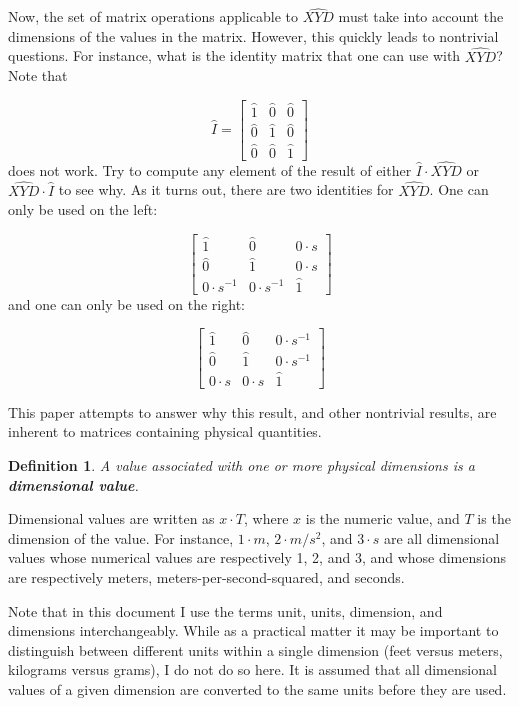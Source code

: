 \documentclass[10pt,letterpaper]{article}
\newtheorem{defn}{Definition}[section]
\numberwithin{equation}{section}
\begin{document}
Now, the set of matrix operations applicable to $\widehat{XYD}$ must take into
account the dimensions of the values in the matrix.  However, this quickly
leads to nontrivial questions.  For instance, what is the identity matrix that
one can use with $\widehat{XYD}$?  Note that

\[ \hat I = \left[ \begin{matrix} 
  \hat 1 & \hat 0 & \hat 0 \\
  \hat 0 & \hat 1 & \hat 0 \\
  \hat 0 & \hat 0 & \hat 1
 \end{matrix} \right] \] does not work.  Try to compute any element of
the result of either $\hat I \cdot \widehat{XYD}$ or $\widehat{XYD}
\cdot \hat I$ to see why.  As it turns out, there are two identities
for $\widehat{XYD}$.  One can only be used on the left:
 
 \[ \left[ \begin{matrix} 
  \hat 1 & \hat 0 & 0 \cdot s \\
  \hat 0 & \hat 1 & 0 \cdot s \\
  0 \cdot s^{-1} & 0 \cdot s^{-1} & \hat 1
 \end{matrix} \right] \] and one can only be used on the right:

\[ \left[ \begin{matrix} 
  \hat 1 & \hat 0 & 0 \cdot s^{-1} \\
  \hat 0 & \hat 1 & 0 \cdot s^{-1} \\
  0 \cdot s & 0 \cdot s & \hat 1
 \end{matrix} \right] \]
 
This paper attempts to answer why this result, and other nontrivial
results, are inherent to matrices containing physical quantities.

\begin{defn} A value associated with one or more physical dimensions
  is a \textbf{dimensional value}. \end{defn}

Dimensional values are written as $x \cdot T$, where $x$ is the
numeric value, and $T$ is the dimension of the value.  For instance,
$1 \cdot m$, $2 \cdot m/s^2$, and $3 \cdot s$ are all dimensional
values whose numerical values are respectively 1, 2, and 3, and whose
dimensions are respectively meters, meters-per-second-squared, and
seconds.
 
Note that in this document I use the terms unit, units, dimension, and
dimensions interchangeably.  While as a practical matter it may be
important to distinguish between different units within a single
dimension (feet versus meters, kilograms versus grams), I do not do so
here.  It is assumed that all dimensional values of a given dimension
are converted to the same units before they are used.
 
\end{document}
